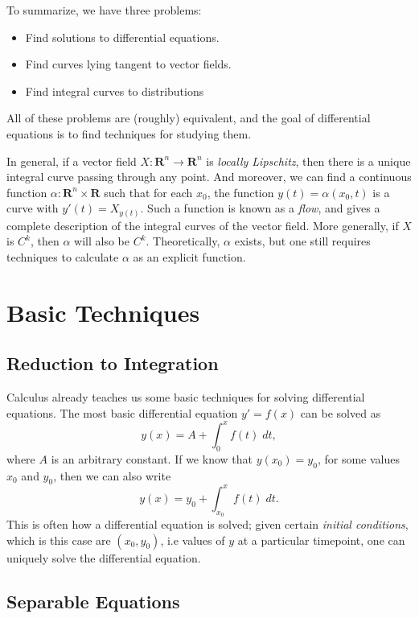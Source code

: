 To summarize, we have three problems:
%
\begin{itemize}
    \item Find solutions to differential equations.
    \item Find curves lying tangent to vector fields.
    \item Find integral curves to distributions
\end{itemize}
%
All of these problems are (roughly) equivalent, and the goal of differential equations is to find techniques for studying them.

In general, if a vector field $X: \mathbf{R}^n \to \mathbf{R}^n$ is \emph{locally Lipschitz}, then there is a unique integral curve passing through any point. And moreover, we can find a continuous function $\alpha: \mathbf{R}^n \times \mathbf{R}$ such that for each $x_0$, the function $y(t) = \alpha(x_0,t)$ is a curve with $y'(t) = X_{y(t)}$. Such a function is known as a \emph{flow}, and gives a complete description of the integral curves of the vector field. More generally, if $X$ is $C^k$, then $\alpha$ will also be $C^k$. Theoretically, $\alpha$ exists, but one still requires techniques to calculate $\alpha$ as an explicit function.   


\chapter{Basic Techniques}

\section{Reduction to Integration}

Calculus already teaches us some basic techniques for solving differential equations. The most basic differential equation $y' = f(x)$ can be solved as
%
\[ y(x) = A + \int_0^x f(t)\; dt,  \]
%
where $A$ is an arbitrary constant. If we know that $y(x_0) = y_0$, for some values $x_0$ and $y_0$, then we can also write
%
\[ y(x) = y_0 + \int_{x_0}^x f(t)\; dt. \]
%
This is often how a differential equation is solved; given certain \emph{initial conditions}, which is this case are $(x_0,y_0)$, i.e values of $y$ at a particular timepoint, one can uniquely solve the differential equation.

\section{Separable Equations}

